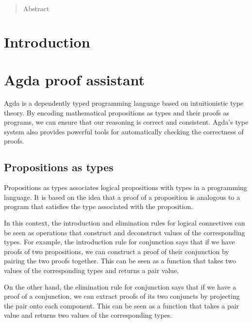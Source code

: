 \documentclass[titlepage]{article}
\begin{document}

\begin{abstract}
    Abstract
\end{abstract}

\tableofcontents
\thispagestyle{empty}
\newpage
\setcounter{page}{1}



\section{Introduction}




\section{Agda proof assistant}
Agda is a dependently typed programming language based on intuitionistic type theory. By encoding mathematical propositions as types and their proofs as programs, we can ensure that our reasoning is correct and consistent. Agda's type system also provides powerful tools for automatically checking the correctness of proofs\cite{BoveDybjer2008}.

\subsection{Propositions as types}
Propositions as types associates logical propositions with types in a programming language. It is based on the idea that a proof of a proposition is analogous to a program that satisfies the type associated with the proposition.

In this context, the introduction and elimination rules for logical connectives can be seen as operations that construct and deconstruct values of the corresponding types. For example, the introduction rule for conjunction says that if we have proofs of two propositions, we can construct a proof of their conjunction by pairing the two proofs together. This can be seen as a function that takes two values of the corresponding types and returns a pair value.

On the other hand, the elimination rule for conjunction says that if we have a proof of a conjunction, we can extract proofs of its two conjuncts by projecting the pair onto each component. This can be seen as a function that takes a pair value and returns two values of the corresponding types.
\end{document}
